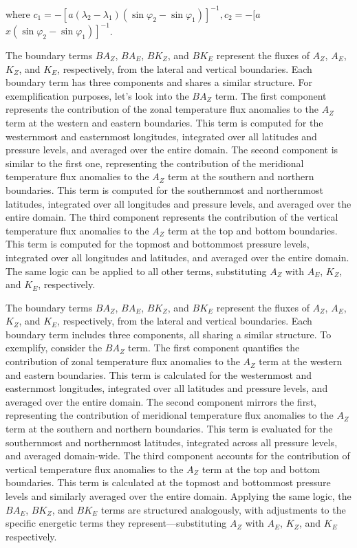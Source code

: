 where $c_1=-\left[a\left(\lambda_2-\lambda_1\right)\left(\sin \varphi_2-\sin \varphi_1\right)\right]^{-1}, c_2=-[a$ $\left.x\left(\sin \varphi_2-\sin \varphi_1\right)\right]^{-1}$.

The boundary terms \(BA_Z\), \(BA_E\), \(BK_Z\), and \(BK_E\) represent the fluxes of \(A_Z\), \(A_E\), \(K_Z\), and \(K_E\), respectively, from the lateral and vertical boundaries. Each boundary term has three components and shares a similar structure. For exemplification purposes, let's look into the \(BA_Z\) term. The first component represents the contribution of the zonal temperature flux anomalies to the \(A_Z\) term at the western and eastern boundaries. This term is computed for the westernmost and easternmost longitudes, integrated over all latitudes and pressure levels, and averaged over the entire domain. The second component is similar to the first one, representing the contribution of the meridional temperature flux anomalies to the \(A_Z\) term at the southern and northern boundaries. This term is computed for the southernmost and northernmost latitudes, integrated over all longitudes and pressure levels, and averaged over the entire domain. The third component represents the contribution of the vertical temperature flux anomalies to the \(A_Z\) term at the top and bottom boundaries. This term is computed for the topmost and bottommost pressure levels, integrated over all longitudes and latitudes, and averaged over the entire domain. The same logic can be applied to all other terms, substituting \(A_Z\) with \(A_E\), \(K_Z\), and \(K_E\), respectively.

The boundary terms \(BA_Z\), \(BA_E\), \(BK_Z\), and \(BK_E\) represent the fluxes of \(A_Z\), \(A_E\), \(K_Z\), and \(K_E\), respectively, from the lateral and vertical boundaries. Each boundary term includes three components, all sharing a similar structure. To exemplify, consider the \(BA_Z\) term. The first component quantifies the contribution of zonal temperature flux anomalies to the \(A_Z\) term at the western and eastern boundaries. This term is calculated for the westernmost and easternmost longitudes, integrated over all latitudes and pressure levels, and averaged over the entire domain. The second component mirrors the first, representing the contribution of meridional temperature flux anomalies to the \(A_Z\) term at the southern and northern boundaries. This term is evaluated for the southernmost and northernmost latitudes, integrated across all pressure levels, and averaged domain-wide. The third component accounts for the contribution of vertical temperature flux anomalies to the \(A_Z\) term at the top and bottom boundaries. This term is calculated at the topmost and bottommost pressure levels and similarly averaged over the entire domain. Applying the same logic, the \(BA_E\), \(BK_Z\), and \(BK_E\) terms are structured analogously, with adjustments to the specific energetic terms they represent—substituting \(A_Z\) with \(A_E\), \(K_Z\), and \(K_E\) respectively.

